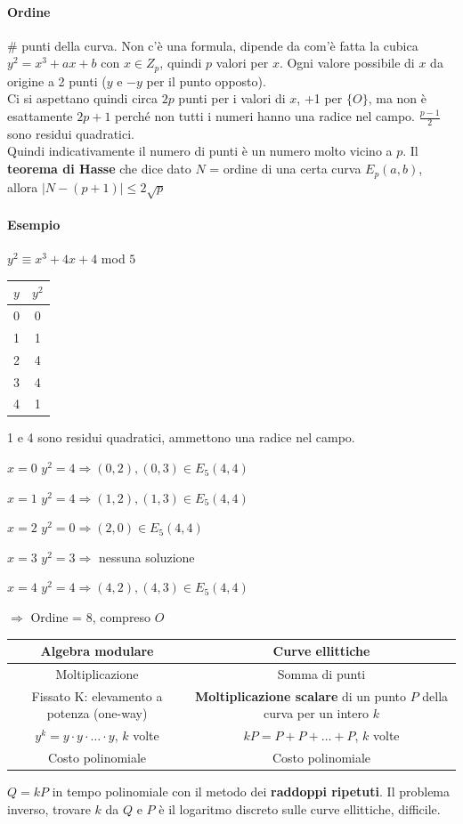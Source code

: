 \documentclass[10pt]{book}
\begin{document}
\paragraph{Ordine} \# punti della curva. Non c'è una formula, dipende da com'è fatta la cubica $y^2 = x^3 + ax + b$ con $x \in Z_p$, quindi $p$ valori per $x$. Ogni valore possibile di $x$ da origine a 2 punti ($y$ e $-y$ per il punto opposto).\\ Ci si aspettano quindi circa $2p$ punti per i valori di $x$, +1 per $\{O\}$, ma non è esattamente $2p + 1$ perché non tutti i numeri hanno una radice nel campo. $\frac{p-1}{2}$ sono residui quadratici.\\
Quindi indicativamente il numero di punti è un numero molto vicino a $p$. Il \textbf{teorema di Hasse} che dice dato $N$ = ordine di una certa curva $E_p(a,b)$, allora $|N - (p+1)|\leq 2\sqrt{p}$
\paragraph{Esempio} $y^2 \equiv x^3 + 4x + 4$ mod $5$\\
\begin{tabular}{c | c}
$y$&$y^2$\\
\hline
0&0\\
1&1\\
2&4\\
3&4\\
4&1
\end{tabular}
1 e 4 sono residui quadratici, ammettono una radice nel campo.
\begin{list}{}{}
	\item[$x= 0$] $y^2 = 4 \Rightarrow (0,2),(0,3)\in E_5(4,4)$
	\item[$x=1$] $y^2 = 4 \Rightarrow (1,2),(1,3) \in E_5(4,4)$
	\item[$x=2$] $y^2 = 0 \Rightarrow (2,0) \in E_5(4,4)$
	\item[$x=3$] $y^2 = 3 \Rightarrow$ nessuna soluzione
	\item[$x=4$] $y^2 = 4 \Rightarrow (4,2), (4,3)\in E_5(4,4)$
	\item[$\Rightarrow$] Ordine = 8, compreso $O$
\end{list}
\begin{center}
\begin{tabular}{c | c}
Algebra modulare & Curve ellittiche\\
\hline
Moltiplicazione & Somma di punti\\
Fissato K: elevamento a potenza (one-way) & \textbf{Moltiplicazione scalare} di un punto $P$ della curva per un intero $k$\\
$y^k = y\cdot y \cdot \ldots \cdot y$, $k$ volte&$kP = P + P + \ldots + P$, $k$ volte\\
Costo polinomiale & Costo polinomiale
\end{tabular}
\end{center}
$Q = kP$ in tempo polinomiale con il metodo dei \textbf{raddoppi ripetuti}. Il problema inverso, trovare $k$ da $Q$ e $P$ è il logaritmo discreto sulle curve ellittiche, difficile.
\pagebreak
\end{document}
